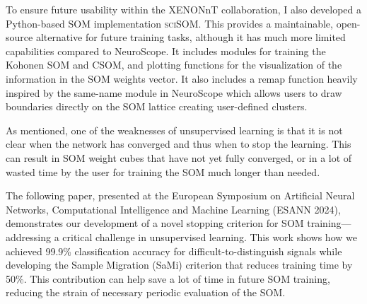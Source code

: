 To ensure future usability within the XENONnT collaboration, I also developed a Python-based SOM implementation \textsc{sciSOM}. This provides a maintainable, open-source alternative for future training tasks, although it has much more limited capabilities compared to NeuroScope. It includes modules for training the Kohonen SOM and CSOM, and plotting functions for the visualization of the information in the SOM weights vector.  It also includes a remap function heavily inspired by the same-name module in NeuroScope which allows users to draw boundaries directly on the SOM lattice creating user-defined clusters.

As mentioned, one of the weaknesses of unsupervised learning is that it is not clear when the network has converged and thus when to stop the learning. This can result in SOM weight cubes that have not yet fully converged, or in a lot of wasted time by the user for training the SOM much longer than needed.

The following paper, presented at the European Symposium on Artificial Neural Networks, Computational Intelligence and Machine Learning (ESANN 2024), demonstrates our development of a novel
stopping criterion for SOM training—addressing a critical challenge in unsupervised learning. This work shows how we achieved 99.9\% classification accuracy for difficult-to-distinguish signals
while developing the Sample Migration (SaMi) criterion that reduces training time by 50\%. This contribution can help save a lot of time in future SOM training, reducing the strain of necessary periodic evaluation of the SOM.


